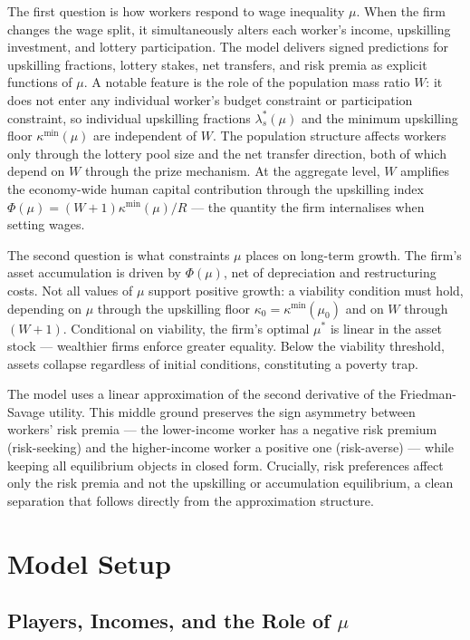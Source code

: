 \documentclass[12pt,a4paper]{article}
\begin{document}
The first question is how workers respond to wage inequality $\mu$.
When the firm changes the wage split, it simultaneously alters each
worker's income, upskilling investment, and lottery participation.
The model delivers signed predictions for upskilling fractions, lottery
stakes, net transfers, and risk premia as explicit functions of $\mu$.
A notable feature is the role of the population mass ratio $W$: it
does not enter any individual worker's budget constraint or participation
constraint, so individual upskilling fractions $\lambda_s^*(\mu)$ and
the minimum upskilling floor $\kappa^{\min}(\mu)$ are independent of
$W$. The population structure affects workers only through the lottery
pool size and the net transfer direction, both of which depend on $W$
through the prize mechanism. At the aggregate level, $W$ amplifies
the economy-wide human capital contribution through the upskilling
index $\Phi(\mu) = (W+1)\kappa^{\min}(\mu)/R$ --- the quantity the
firm internalises when setting wages.

The second question is what constraints $\mu$ places on long-term
growth. The firm's asset accumulation is driven by $\Phi(\mu)$, net
of depreciation and restructuring costs. Not all values of $\mu$
support positive growth: a viability condition must hold, depending
on $\mu$ through the upskilling floor $\kappa_0 = \kappa^{\min}(\mu_0)$
and on $W$ through $(W+1)$. Conditional on viability, the firm's
optimal $\mu^*$ is linear in the asset stock --- wealthier firms
enforce greater equality. Below the viability threshold, assets
collapse regardless of initial conditions, constituting a poverty trap.

The model uses a linear approximation of the second derivative of the
Friedman-Savage utility. This middle ground preserves the sign asymmetry
between workers' risk premia --- the lower-income worker has a negative
risk premium (risk-seeking) and the higher-income worker a positive one
(risk-averse) --- while keeping all equilibrium objects in closed form.
Crucially, risk preferences affect only the risk premia and not the
upskilling or accumulation equilibrium, a clean separation that follows
directly from the approximation structure.

\section{Model Setup}

\subsection{Players, Incomes, and the Role of $\mu$}
\end{document}

